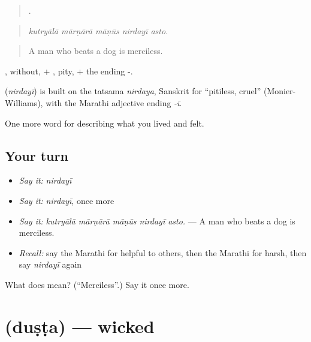 \begin{quote}
    .
\end{quote}

\begin{quote}
\emph{kutryālā mārṇārā māṇūs nirdayī asto.}
\end{quote}

\begin{quote}
A man who beats a dog is merciless.
\end{quote}

, without, + , pity, + the ending -.

\begin{cousinweb}
\textbf{} (\emph{nirdayī}) is built on the tatsama \emph{nirdaya}, Sanskrit for \textquotedblleft{}pitiless, cruel\textquotedblright{} (Monier-Williams), with the Marathi adjective ending \emph{-ī}.
\end{cousinweb}

\begin{grammarlens}[title={What you've built}]
One more word for describing what you lived and felt.
\end{grammarlens}

\subsection*{Your turn}
\begin{itemize}
\raggedright
  \item \emph{Say it:} \emph{nirdayī}
  \item \emph{Say it:} \emph{nirdayī}, once more
  \item \emph{Say it:} \emph{kutryālā mārṇārā māṇūs nirdayī asto.} — A man who beats a dog is merciless.
  \item \emph{Recall:} say the Marathi for helpful to others, then the Marathi for harsh, then say \emph{nirdayī} again
\end{itemize}

\begin{tcolorbox}[breakable,colback=teal!4,colframe=teal!35!black,title={Before you move on}]
What does  mean? (\textquotedblleft{}Merciless\textquotedblright{}.) Say it once more.
\end{tcolorbox}
\section[\texorpdfstring{\mr{दुष्ट} (duṣṭa)}{दुष्ट (duṣṭa)}]{ (duṣṭa) — wicked}

